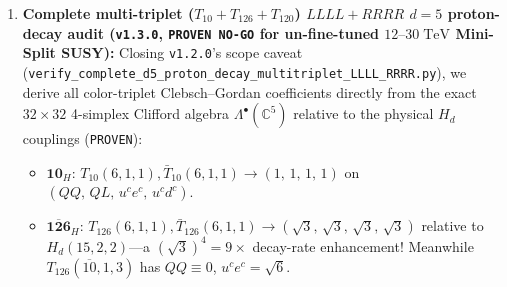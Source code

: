 \documentclass[11pt,a4paper]{article}
\begin{document}
\begin{enumerate}
    Introducing the missing-VEV doublet--triplet splitting superpotential $W_{\mathrm{DT}} = \lambda\,\mathbf{10}_H\mathbf{45}_{B-L}\mathbf{10}'_H + M'\mathbf{10}'_H\mathbf{10}'_H$ leaves an extra Higgs doublet pair $(H'_u, H'_d)$ at mass $M'$ ($\Delta b_1 = 3/5, \Delta b_2 = 1, \Delta b_3 = 0$) while suppressing $(M_T^{-1})_{11} = M'/M_U^2$ by $M_U/M'$. Auditing this at \textbf{full 2-loop MSSM accuracy} shows strong sensitivity to $M_{\mathrm{SUSY}}$, 2-loop Yukawas, and $\mathcal{O}(1)$ GUT thresholds: pure-gauge 2-loop at $M_{\mathrm{SUSY}} = 2\;\mathrm{TeV}$ already has $\Delta\alpha_3^{-1} = +0.0602 > 0$ (no exact DW root $M' < M_U$; with Yukawas $\Delta\alpha_3^{-1} = -0.0033$, $M' \approx M_U$), while $M_{\mathrm{SUSY}} = 12\;\mathrm{TeV}$ yields $M_U/M' = 5.12\times$ (pure gauge) to $6.75\times$ (with Yukawas, $M' = 1.11\times 10^{15}\;\mathrm{GeV}, M_U = 7.47\times 10^{15}\;\mathrm{GeV}$; 1-loop Mini-Split gives $3.39\times$). On isolated, uncancelled $T_{10}$ $LLLL$ exchange alone (calibrated against Murayama--Pierce minimal SUSY $SU(5)$: $1.63\times 10^{30}\;\mathrm{yr}$ at $1\;\mathrm{TeV}, \tan\beta=3$), naive TeV-SUSY ($2\;\mathrm{TeV}$) gives $\tau(p\to K^+\bar\nu_\tau)|_{T_{10},LLLL} = 3.81\times 10^{27}\;\mathrm{yr} \ll 5.9\times 10^{33}\;\mathrm{yr}$ Super-K ($M_{\tilde q}^{\min} = 75.7\;\mathrm{TeV}$ uncancelled; $29.1\text{--}44.4\;\mathrm{TeV}$ under 2-loop $6.75\times$ DW; $11.9\text{--}18.2\;\mathrm{TeV}$ under an illustrative $40\times$ $T_{10}$ suppression).
    \item \textbf{Complete multi-triplet ($T_{10} + T_{126} + T_{120}$) $LLLL + RRRR$ $d=5$ proton-decay audit (\texttt{v1.3.0}, \texttt{PROVEN NO-GO} for un-fine-tuned $12\text{--}30\;\mathrm{TeV}$ Mini-Split SUSY):}
    Closing \texttt{v1.2.0}'s scope caveat (\texttt{verify\_\allowbreak complete\_\allowbreak d5\_\allowbreak proton\_\allowbreak decay\_\allowbreak multitriplet\_\allowbreak LLLL\_\allowbreak RRRR.py}), we derive all color-triplet Clebsch--Gordan coefficients directly from the exact $32\times 32$ 4-simplex Clifford algebra $\Lambda^\bullet(\mathbb{C}^5)$ relative to the physical $H_d$ couplings (\texttt{PROVEN}):
    \begin{itemize}
        \item $\mathbf{10}_H$: $T_{10}(6,1,1), \bar T_{10}(6,1,1) \to (1,\, 1,\, 1,\, 1)$ on $(QQ,\, QL,\, u^c e^c,\, u^c d^c)$.
        \item $\overline{\mathbf{126}}_H$: $T_{126}(6,1,1), \bar T_{126}(6,1,1) \to (\sqrt{3},\, \sqrt{3},\, \sqrt{3},\, \sqrt{3})$ relative to $H_d(15,2,2)$---a $(\sqrt{3})^4 = 9\times$ decay-rate enhancement! Meanwhile $T_{126}(\overline{10},1,3)$ has $QQ \equiv 0$, $u^c e^c = \sqrt{6}$.

\end{itemize}
\end{enumerate}
\end{document}
